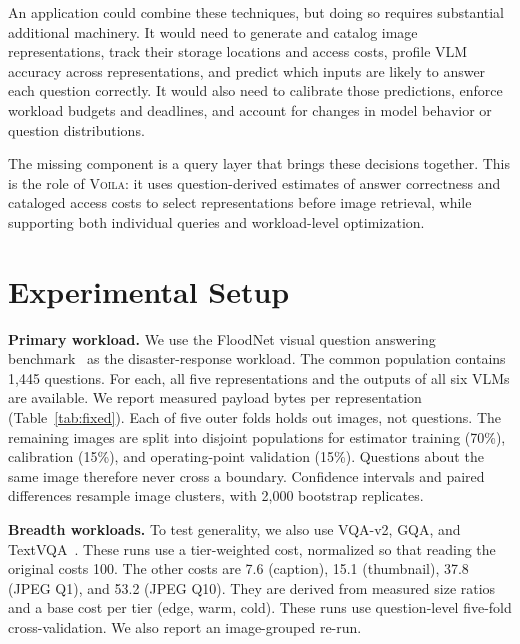 \documentclass[10pt,conference]{IEEEtran}
\newcommand{\system}{\textsc{Voila}\xspace}
\begin{document}
An application could combine these techniques, but doing so requires substantial additional machinery. It would need to generate and catalog image representations, track their storage locations and access costs, profile VLM accuracy across representations, and predict which inputs are likely to answer each question correctly. It would also need to calibrate those predictions, enforce workload budgets and deadlines, and account for changes in model behavior or question distributions.

The missing component is a query layer that brings these decisions together. This is the role of \system: it uses question-derived estimates of answer correctness and cataloged access costs to select representations before image retrieval, while supporting both individual queries and workload-level optimization.







\section{Experimental Setup}
\label{sec:setup}

\textbf{Primary workload.} We use the FloodNet visual question answering
benchmark~\cite{rahnemoonfar2021floodnet} as the disaster-response workload.
The common population contains 1,445 questions. For each, all five
representations and the outputs of all six VLMs are available. We report
measured payload bytes per representation (Table~\ref{tab:fixed}). Each of five
outer folds holds out images, not questions. The remaining images are split
into disjoint populations for estimator training (70\%), calibration (15\%),
and operating-point validation (15\%). Questions about the same image therefore never
cross a boundary. Confidence intervals and paired differences resample image
clusters, with 2,000 bootstrap replicates.

\textbf{Breadth workloads.} To test generality, we also use VQA-v2, GQA, and
TextVQA~\cite{goyal2017vqav2,hudson2019gqa,singh2019textvqa}. These runs use a
tier-weighted cost, normalized so that reading the original costs 100. The
other costs are 7.6 (caption), 15.1 (thumbnail), 37.8 (JPEG Q1), and 53.2 (JPEG
Q10). They are derived from measured size ratios and a base cost per tier
(edge, warm, cold). These runs use question-level five-fold cross-validation.
We also report an image-grouped re-run.
\end{document}
